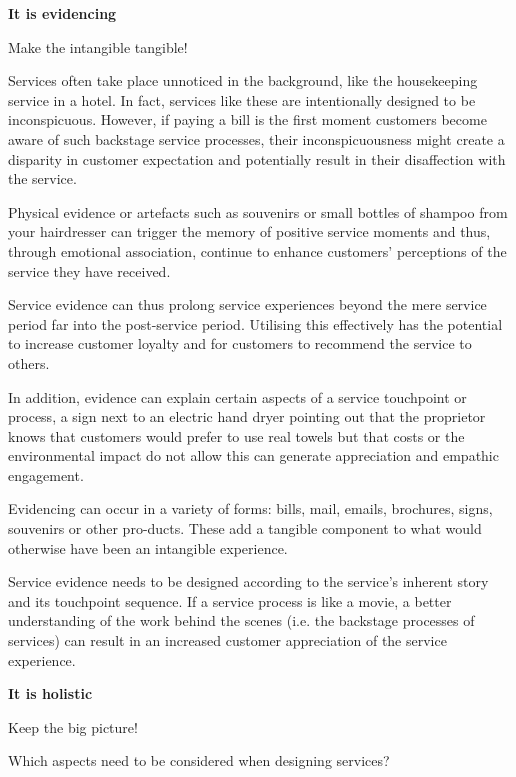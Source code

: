 \textbf{It is evidencing}


Make the intangible tangible!

Services often take place unnoticed in the background, like the housekeeping service in a hotel. In fact, services like these are intentionally designed to be inconspicuous. However, if paying a bill is the first moment customers become aware of such backstage service processes, their inconspicuousness might create a disparity in customer expectation and potentially result in their disaffection with the service.

Physical evidence or artefacts such as souvenirs or small bottles of shampoo from your hairdresser can trigger the memory of positive service moments and thus, through emotional association, continue to enhance customers’ perceptions of the service they have received.

Service evidence can thus prolong service experiences beyond the mere service period far into the post-service period. Utilising this effectively has the potential to increase customer loyalty and for customers to recommend the service to others. %

In addition, evidence can explain certain aspects of a service touchpoint or process, a sign next to an electric hand dryer pointing out that the proprietor knows that customers would prefer to use real towels but that costs or the environmental impact do not allow this can generate appreciation and empathic engagement.

Evidencing can occur in a variety of forms: bills, mail, emails, brochures, signs, souvenirs or other pro-ducts. These add a tangible component to what would otherwise have been an intangible experience.

Service evidence needs to be designed according to the service’s inherent story and its touchpoint sequence. If a service process is like a movie, a better understanding of the work behind the scenes (i.e. the backstage processes of services) can result in an increased customer appreciation of the service experience.

\textbf{It is holistic}

Keep the big picture!

Which aspects need to be considered when designing services?

